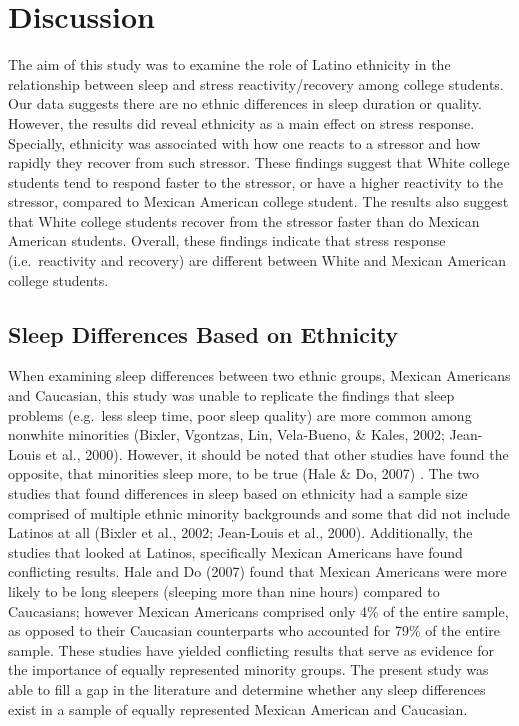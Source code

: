 \documentclass[
  man, fleqn, noextraspace]{apa6}
\begin{document}
\hypertarget{discussion}{%
\section{Discussion}\label{discussion}}

The aim of this study was to examine the role of Latino ethnicity in the relationship between sleep and stress reactivity/recovery among college students. Our data suggests there are no ethnic differences in sleep duration or quality. However, the results did reveal ethnicity as a main effect on stress response. Specially, ethnicity was associated with how one reacts to a stressor and how rapidly they recover from such stressor. These findings suggest that White college students tend to respond faster to the stressor, or have a higher reactivity to the stressor, compared to Mexican American college student. The results also suggest that White college students recover from the stressor faster than do Mexican American students. Overall, these findings indicate that stress response (i.e.~reactivity and recovery) are different between White and Mexican American college students.

\hypertarget{sleep-differences-based-on-ethnicity}{%
\subsection{Sleep Differences Based on Ethnicity}\label{sleep-differences-based-on-ethnicity}}

When examining sleep differences between two ethnic groups, Mexican Americans and Caucasian, this study was unable to replicate the findings that sleep problems (e.g.~less sleep time, poor sleep quality) are more common among nonwhite minorities (Bixler, Vgontzas, Lin, Vela-Bueno, \& Kales, 2002; Jean-Louis et al., 2000). However, it should be noted that other studies have found the opposite, that minorities sleep more, to be true (Hale \& Do, 2007) . The two studies that found differences in sleep based on ethnicity had a sample size comprised of multiple ethnic minority backgrounds and some that did not include Latinos at all (Bixler et al., 2002; Jean-Louis et al., 2000). Additionally, the studies that looked at Latinos, specifically Mexican Americans have found conflicting results. Hale and Do (2007) found that Mexican Americans were more likely to be long sleepers (sleeping more than nine hours) compared to Caucasians; however Mexican Americans comprised only 4\% of the entire sample, as opposed to their Caucasian counterparts who accounted for 79\% of the entire sample. These studies have yielded conflicting results that serve as evidence for the importance of equally represented minority groups.
The present study was able to fill a gap in the literature and determine whether any sleep differences exist in a sample of equally represented Mexican American and Caucasian.
\end{document}
